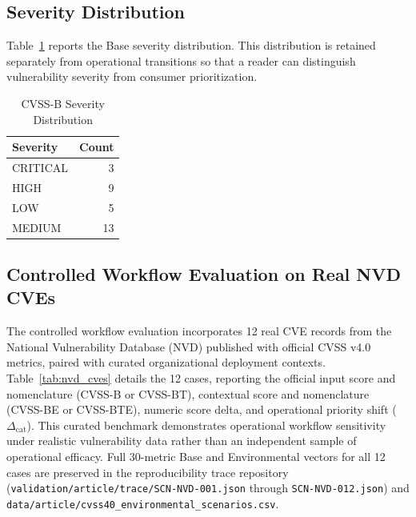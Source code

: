 \documentclass[conference]{IEEEtran}
\begin{document}
\subsection{Severity Distribution}

Table~\ref{tab:severity} reports the Base severity distribution. This
distribution is retained separately from operational transitions so that a
reader can distinguish vulnerability severity from consumer prioritization.

\begin{table}[t]
\caption{CVSS-B Severity Distribution}
\label{tab:severity}
\centering
\small
\begin{tabular}{@{}lr@{}}
\toprule
Severity & Count \\
\midrule
CRITICAL & 3 \\
HIGH & 9 \\
LOW & 5 \\
MEDIUM & 13 \\
\bottomrule
\end{tabular}
\end{table}
\subsection{Controlled Workflow Evaluation on Real NVD CVEs}

The controlled workflow evaluation incorporates 12 real CVE records from the National Vulnerability Database (NVD) published with official CVSS v4.0 metrics, paired with curated organizational deployment contexts. Table~\ref{tab:nvd_cves} details the 12 cases, reporting the official input score and nomenclature (CVSS-B or CVSS-BT), contextual score and nomenclature (CVSS-BE or CVSS-BTE), numeric score delta, and operational priority shift ($\Delta_{\text{cat}}$). This curated benchmark demonstrates operational workflow sensitivity under realistic vulnerability data rather than an independent sample of operational efficacy. Full 30-metric Base and Environmental vectors for all 12 cases are preserved in the reproducibility trace repository (\texttt{validation/article/trace/SCN-NVD-001.json} through \texttt{SCN-NVD-012.json}) and \texttt{data/article/\allowbreak cvss40\_\allowbreak environmental\_\allowbreak scenarios.csv}.
\end{document}
